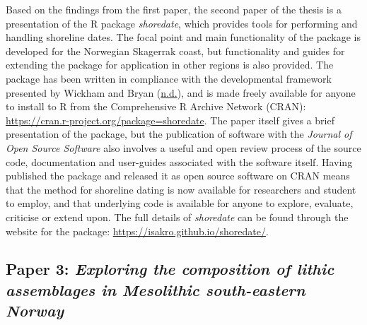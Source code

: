 \documentclass[
  12pt,
  a4paper,
  oneside]{book}
\begin{document}
Based on the findings from the first paper, the second paper of the thesis is a presentation of the R package \emph{shoredate}, which provides tools for performing and handling shoreline dates. The focal point and main functionality of the package is developed for the Norwegian Skagerrak coast, but functionality and guides for extending the package for application in other regions is also provided. The package has been written in compliance with the developmental framework presented by Wickham and Bryan (\protect\hyperlink{ref-wickhamnd}{n.d.}), and is made freely available for anyone to install to R from the Comprehensive R Archive Network (CRAN): \url{https://cran.r-project.org/package=shoredate}. The paper itself gives a brief presentation of the package, but the publication of software with the \emph{Journal of Open Source Software} also involves a useful and open review process of the source code, documentation and user-guides associated with the software itself. Having published the package and released it as open source software on CRAN means that the method for shoreline dating is now available for researchers and student to employ, and that underlying code is available for anyone to explore, evaluate, criticise or extend upon. The full details of \emph{shoredate} can be found through the website for the package: \url{https://isakro.github.io/shoredate/}.

\hypertarget{paper-3-exploring-the-composition-of-lithic-assemblages-in-mesolithic-south-eastern-norway}{%
\subsection{\texorpdfstring{Paper 3: \emph{Exploring the composition of lithic assemblages in Mesolithic south-eastern Norway}}{Paper 3: Exploring the composition of lithic assemblages in Mesolithic south-eastern Norway}}\label{paper-3-exploring-the-composition-of-lithic-assemblages-in-mesolithic-south-eastern-norway}}
\end{document}
